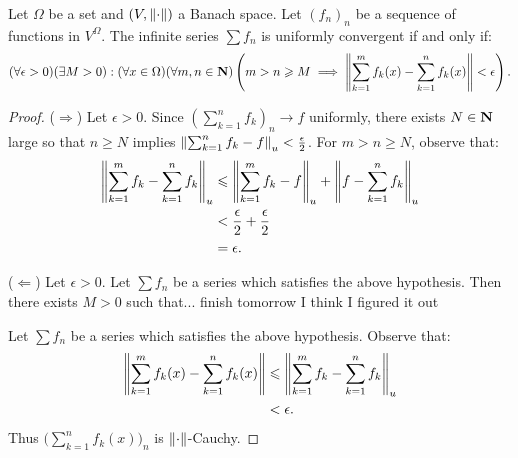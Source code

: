 \documentclass[11pt,twoside,openany]{memoir}
\begin{document}
    \begin{lemma}\label{lemma:cauchy-criterion}
        Let $\Omega$ be a set and $(V,\left\lVert \cdot \right\rVert)$ a Banach space. Let $(f_n)_n$ be a sequence of functions in $V^\Omega$. The infinite series $\sum f_n$ is uniformly convergent if and only if:
            \begin{equation*}
            \begin{split}
                (\forall \epsilon > 0)(\exists M > 0):(\forall x \in \Omega)(\forall m,n \in \mathbf{N})\left(m > n \geqslant M \implies \left\lVert \sum_{k = 1}^m f_k(x) - \sum_{k = 1}^n f_k(x) \right\rVert < \epsilon\right).
            \end{split}
            \end{equation*}
    \end{lemma}
        \begin{proof}
            ($\Rightarrow$) Let $\epsilon > 0$. Since $\left( \sum_{k = 1}^n f_k \right)_n \rightarrow f$ uniformly, there exists $N \in \mathbf{N}$ large so that $n \geq N$ implies $\left\lVert \sum_{k = 1}^n f_k - f \right\rVert_u < \frac{\epsilon}{2}$. For $m > n \geq N$, observe that:
                \begin{equation*}
                \begin{split}
                    \left\lVert \sum_{k = 1}^m f_k - \sum_{k = 1}^n f_k \right\rVert_u
                    & \leqslant \left\lVert \sum_{k = 1}^m f_k - f \right\rVert_u + \left\lVert f - \sum_{k = 1}^n f_k \right\rVert_u \\
                    & < \frac{\epsilon}{2} + \frac{\epsilon}{2} \\
                    & = \epsilon.
                \end{split}
                \end{equation*}


                

            ($\Leftarrow$) Let $\epsilon > 0$. Let $\sum f_n$ be a series which satisfies the above hypothesis. Then there exists $M > 0$ such that... finish tomorrow I think I figured it out
            
            Let $\sum f_n$ be a series which satisfies the above hypothesis. Observe that:
                \begin{equation*}
                \begin{split}
                    \left\lVert \sum_{k = 1}^m f_k(x) - \sum_{k = 1}^n f_k(x) \right\rVert
                    & \leqslant\left\lVert \sum_{k = 1}^m f_k - \sum_{k = 1}^n f_k \right\rVert_u \\
                    & < \epsilon.
                \end{split}
                \end{equation*}
            Thus $\bigl( \sum_{k = 1}^n f_k(x) \bigr)_n$ is $\left\lVert \cdot \right\rVert$-Cauchy.
        \end{proof}
\end{document}
